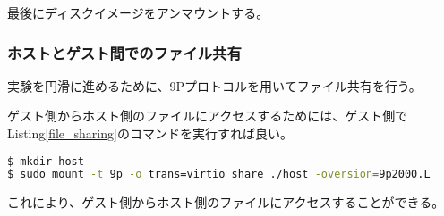 \documentclass[main]{subfiles}
\begin{document}
最後にディスクイメージをアンマウントする。

\subsubsection{ホストとゲスト間でのファイル共有}

実験を円滑に進めるために、9Pプロトコルを用いてファイル共有を行う。

ゲスト側からホスト側のファイルにアクセスするためには、ゲスト側でListing\ref{file_sharing}のコマンドを実行すれば良い。

\begin{lstlisting}[language=sh,label=file_sharing,caption=アクセス手順]
$ mkdir host
$ sudo mount -t 9p -o trans=virtio share ./host -oversion=9p2000.L
\end{lstlisting}

これにより、ゲスト側からホスト側のファイルにアクセスすることができる。
\end{document}
